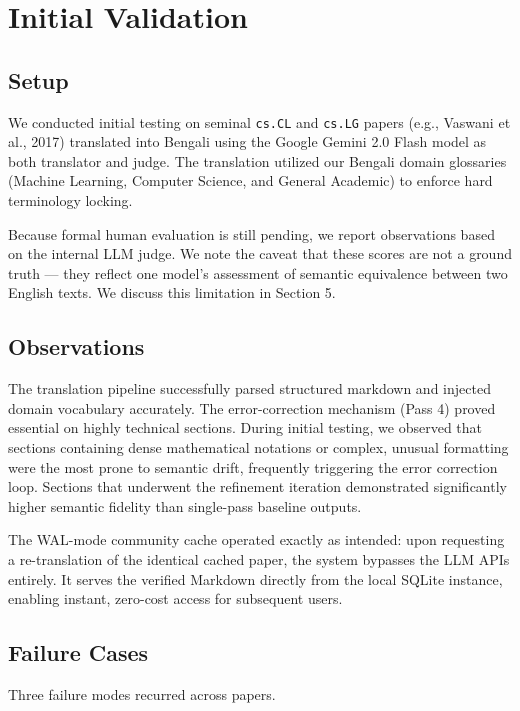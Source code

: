 \documentclass{article}
\begin{document}
\section{Initial Validation}

\subsection{Setup}

We conducted initial testing on seminal \texttt{cs.CL} and \texttt{cs.LG} papers (e.g., Vaswani et al., 2017) translated into Bengali using the Google Gemini 2.0 Flash model as both translator and judge. The translation utilized our Bengali domain glossaries (Machine Learning, Computer Science, and General Academic) to enforce hard terminology locking.

Because formal human evaluation is still pending, we report observations based on the internal LLM judge. We note the caveat that these scores are not a ground truth --- they reflect one model's assessment of semantic equivalence between two English texts. We discuss this limitation in Section 5.

\subsection{Observations}

The translation pipeline successfully parsed structured markdown and injected domain vocabulary accurately. The error-correction mechanism (Pass 4) proved essential on highly technical sections. During initial testing, we observed that sections containing dense mathematical notations or complex, unusual formatting were the most prone to semantic drift, frequently triggering the error correction loop. Sections that underwent the refinement iteration demonstrated significantly higher semantic fidelity than single-pass baseline outputs.

The WAL-mode community cache operated exactly as intended: upon requesting a re-translation of the identical cached paper, the system bypasses the LLM APIs entirely. It serves the verified Markdown directly from the local SQLite instance, enabling instant, zero-cost access for subsequent users.

\subsection{Failure Cases}

Three failure modes recurred across papers.
\end{document}

